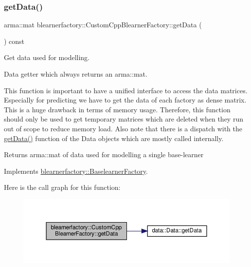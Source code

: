 \subsubsection{\texorpdfstring{get\+Data()}{getData()}}
{\footnotesize\ttfamily arma\+::mat blearnerfactory\+::\+Custom\+Cpp\+Blearner\+Factory\+::get\+Data (\begin{DoxyParamCaption}{ }\end{DoxyParamCaption}) const\hspace{0.3cm}{\ttfamily [virtual]}}



Get data used for modelling. 

Data getter which always returns an arma\+::mat.

This function is important to have a unified interface to access the data matrices. Especially for predicting we have to get the data of each factory as dense matrix. This is a huge drawback in terms of memory usage. Therefore, this function should only be used to get temporary matrices which are deleted when they run out of scope to reduce memory load. Also note that there is a dispatch with the \mbox{\hyperlink{classblearnerfactory_1_1_custom_cpp_blearner_factory_a29cc0d142660d6e52245c264f71dd651}{get\+Data()}} function of the Data objects which are mostly called internally.

\begin{DoxyReturn}{Returns}
{\ttfamily arma\+::mat} of data used for modelling a single base-\/learner 
\end{DoxyReturn}


Implements \mbox{\hyperlink{classblearnerfactory_1_1_baselearner_factory_aa3e4580bca870ca3b742dda6c820e1e6}{blearnerfactory\+::\+Baselearner\+Factory}}.

Here is the call graph for this function\+:\nopagebreak
\begin{figure}[H]
\begin{center}
\leavevmode
\includegraphics[width=350pt]{classblearnerfactory_1_1_custom_cpp_blearner_factory_a29cc0d142660d6e52245c264f71dd651_cgraph}
\end{center}
\end{figure}
\mbox{\label{classblearnerfactory_1_1_custom_cpp_blearner_factory_abc9c251017197087af3ef8a1c0421969}} 
